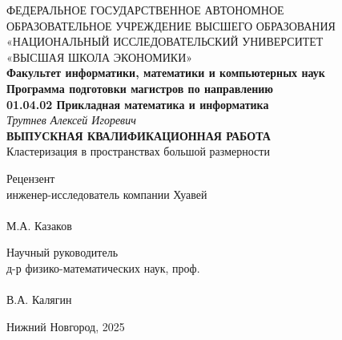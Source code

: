 \begin{titlepage}

    \begin{center}
        ФЕДЕРАЛЬНОЕ  ГОСУДАРСТВЕННОЕ АВТОНОМНОЕ \\
        ОБРАЗОВАТЕЛЬНОЕ УЧРЕЖДЕНИЕ
        ВЫСШЕГО ОБРАЗОВАНИЯ
        «НАЦИОНАЛЬНЫЙ ИССЛЕДОВАТЕЛЬСКИЙ УНИВЕРСИТЕТ \\
        «ВЫСШАЯ ШКОЛА ЭКОНОМИКИ»
        \\
        \vspace{10mm}
        \textbf{
            Факультет информатики, математики и компьютерных наук \\
            Программа подготовки магистров по направлению \\
            01.04.02 Прикладная математика и информатика
        }
        \\
        \vspace{20mm}
        \textit{Трутнев Алексей Игоревич}
        \\
        \textbf{ВЫПУСКНАЯ КВАЛИФИКАЦИОННАЯ РАБОТА}
        \\
        \vspace{10mm}
        Кластеризация в пространствах большой размерности
        \vspace{10mm}
    \end{center}

    \vspace{50mm}

    \hfill
    \begin{minipage}{0.4\textwidth}
        \begin{flushleft}
            Рецензент \\
            инженер-исследователь компании Хуавей \\
            \signatureline[6cm]{}
            \\
            М.А. Казаков
        \end{flushleft}
    \end{minipage}
    \hfill
    \begin{minipage}{0.4\textwidth}
        \begin{flushright}
            Научный руководитель \\
            д-р физико-математических наук, проф. \\
            \signatureline[6cm]{}
            \\
            В.А. Калягин
        \end{flushright}
    \end{minipage}

    \begin{center}
        \vspace*{\fill}
        Нижний Новгород, 2025
    \end{center}

\end{titlepage}